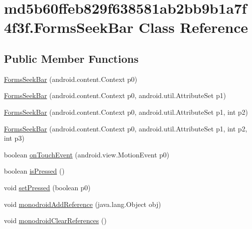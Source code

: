 \hypertarget{classmd5b60ffeb829f638581ab2bb9b1a7f4f3f_1_1_forms_seek_bar}{
\section{md5b60ffeb829f638581ab2bb9b1a7f4f3f.FormsSeekBar Class Reference}
\label{classmd5b60ffeb829f638581ab2bb9b1a7f4f3f_1_1_forms_seek_bar}
}
\subsection*{Public Member Functions}
\begin{CompactItemize}
\item 
\hyperlink{classmd5b60ffeb829f638581ab2bb9b1a7f4f3f_1_1_forms_seek_bar_702512b58f3e4e250bf52ad5c064f83a}{FormsSeekBar} (android.content.Context p0)
\item 
\hyperlink{classmd5b60ffeb829f638581ab2bb9b1a7f4f3f_1_1_forms_seek_bar_2fed7f17c8acbe1d59dd917b841b8a23}{FormsSeekBar} (android.content.Context p0, android.util.AttributeSet p1)
\item 
\hyperlink{classmd5b60ffeb829f638581ab2bb9b1a7f4f3f_1_1_forms_seek_bar_2c2467e8fb04433f1c7a2333d4893891}{FormsSeekBar} (android.content.Context p0, android.util.AttributeSet p1, int p2)
\item 
\hyperlink{classmd5b60ffeb829f638581ab2bb9b1a7f4f3f_1_1_forms_seek_bar_fadadb0b016eb3d0ebcb4b884852a46d}{FormsSeekBar} (android.content.Context p0, android.util.AttributeSet p1, int p2, int p3)
\item 
boolean \hyperlink{classmd5b60ffeb829f638581ab2bb9b1a7f4f3f_1_1_forms_seek_bar_2a80911e4812d35846f878170806ba84}{onTouchEvent} (android.view.MotionEvent p0)
\item 
boolean \hyperlink{classmd5b60ffeb829f638581ab2bb9b1a7f4f3f_1_1_forms_seek_bar_5ba10e44e1797cb266b3fa57c4604e42}{isPressed} ()
\item 
void \hyperlink{classmd5b60ffeb829f638581ab2bb9b1a7f4f3f_1_1_forms_seek_bar_3e8785634191b0032360570d26a6cd8a}{setPressed} (boolean p0)
\item 
void \hyperlink{classmd5b60ffeb829f638581ab2bb9b1a7f4f3f_1_1_forms_seek_bar_3501991d7e241e3974a47f91a20a02ec}{monodroidAddReference} (java.lang.Object obj)
\item 
void \hyperlink{classmd5b60ffeb829f638581ab2bb9b1a7f4f3f_1_1_forms_seek_bar_b7e97d04898da771ddfe5cbc716b8d87}{monodroidClearReferences} ()
\end{CompactItemize}
